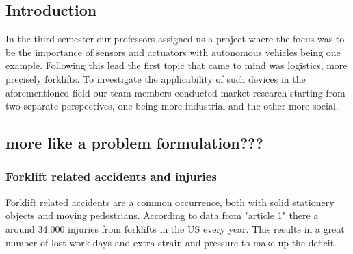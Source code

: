 \documentclass[11pt]{article}
\begin{document}





    \subsection{Introduction} %
    In the third semester our professors assigned us a project where
    the focus was to be the importance of sensors and actuators with
    autonomous vehicles being one example. Following this lead the first
    topic that came to mind was logistics, more precisely forklifts.
    To investigate the applicability of such devices in the 
    aforementioned field our team members conducted market research 
    starting from two separate perspectives, one being more 
    industrial and the other more social.

    \subsection{more like a problem formulation???}
    \subsubsection{Forklift related accidents and injuries}
    Forklift related accidents are a common occurrence, both with solid
    stationery objects and moving pedestrians. According to data from "article
    1" there a around 34,000 injuries from forklifts in the US every year. This
    results in a great number of lost work days and extra strain and 
    pressure to make up the deficit.
\end{document}
